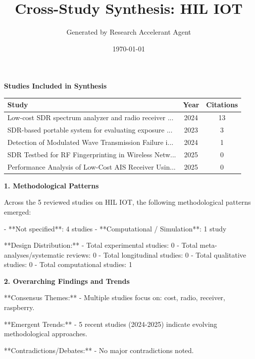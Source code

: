 \documentclass[11pt,a4paper]{article}
\title{\textbf{Cross-Study Synthesis: HIL IOT}}
\author{Generated by Research Accelerant Agent}
\date{\today}
\begin{document}
\maketitle



\textbf{\large Studies Included in Synthesis}\par\vspace{0.5em}

\begin{longtable}{p{5cm}cc}
\toprule
\textbf{Study} & \textbf{Year} & \textbf{Citations} \\
\midrule
\endhead
Low-cost SDR spectrum analyzer and radio receiver ... & 2024 & 13 \\
SDR-based portable system for evaluating exposure ... & 2023 & 3 \\
Detection of Modulated Wave Transmission Failure i... & 2024 & 1 \\
SDR Testbed for RF Fingerprinting in Wireless Netw... & 2025 & 0 \\
Performance Analysis of Low-Cost AIS Receiver Usin... & 2025 & 0 \\
\bottomrule
\end{longtable}

\vspace{1em}


\textbf{\large 1. Methodological Patterns}\par\vspace{0.5em}

Across the 5 reviewed studies on HIL IOT, the following methodological patterns emerged:

- **Not specified**: 4 studies
- **Computational / Simulation**: 1 study

**Design Distribution:**
- Total experimental studies: 0
- Total meta-analyses/systematic reviews: 0
- Total longitudinal studies: 0
- Total qualitative studies: 0
- Total computational studies: 1

\vspace{1em}


\textbf{\large 2. Overarching Findings and Trends}\par\vspace{0.5em}

**Consensus Themes:**
- Multiple studies focus on: cost, radio, receiver, raspberry.

**Emergent Trends:**
- 5 recent studies (2024-2025) indicate evolving methodological approaches.

**Contradictions/Debates:**
- No major contradictions noted.
\end{document}
